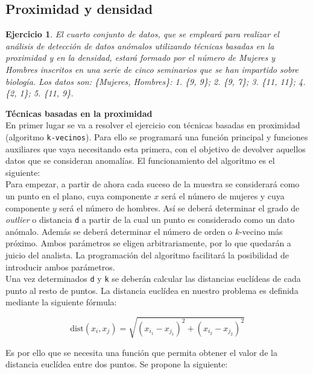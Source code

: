 \documentclass[12pt]{report}\usepackage[]{graphicx}\usepackage[dvipsnames]{xcolor}
\newtheorem{exercise}{Ejercicio}[section]
\newcommand{\dt}{\text{dist}}
\begin{document}
			\subsection{Proximidad y densidad}
			
				\begin{exercise}
					El cuarto conjunto de datos, que se empleará para realizar el análisis de detección de datos anómalos utilizando técnicas basadas en la proximidad y en la densidad, estará formado por el número de Mujeres y Hombres inscritos en una serie de cinco seminarios que se han impartido sobre biología. Los datos son: \{Mujeres, Hombres\}: 1. \{9, 9\}; 2. \{9, 7\}; 3. \{11, 11\}; 4. \{2, 1\}; 5. \{11, 9\}.
				\end{exercise}
					
					\textbf{Técnicas basadas en la proximidad}\\
					
					En primer lugar se va a resolver el ejercicio con técnicas basadas en proximidad (algoritmo \texttt{k-vecinos}). Para ello se programará una función principal y funciones auxiliares que vaya necesitando esta primera, con el objetivo de devolver aquellos datos que se consideran anomalías. El funcionamiento del algoritmo es el siguiente: \\
					
					Para empezar, a partir de ahora cada suceso de la muestra se considerará como un punto en el plano, cuya componente $x$ será el número de mujeres y cuya componente $y$ será el número de hombres. Así se deberá determinar el grado de \textit{outlier} o distancia \texttt{d} a partir de la cual un punto es considerado como un dato anómalo. Además se deberá determinar el número de orden o $k$-vecino más próximo. Ambos parámetros se eligen arbitrariamente, por lo que quedarán a juicio del analista. La programación del algoritmo facilitará la posibilidad de introducir ambos parámetros.\\
					
					Una vez determinados \texttt{d} y \texttt{k} se deberán calcular las distancias euclídeas de cada punto al resto de puntos. La distancia euclídea en nuestro problema es definida mediante la siguiente fórmula:
					
					$$
					\dt(x_i, x_j) = \sqrt{(x_{i_1}-x_{j_1})^2 + (x_{i_2}-x_{j_2})^2}
					$$
					
					Es por ello que se necesita una función que permita obtener el valor de la distancia euclídea entre dos puntos. Se propone la siguiente:
					
\end{document}
